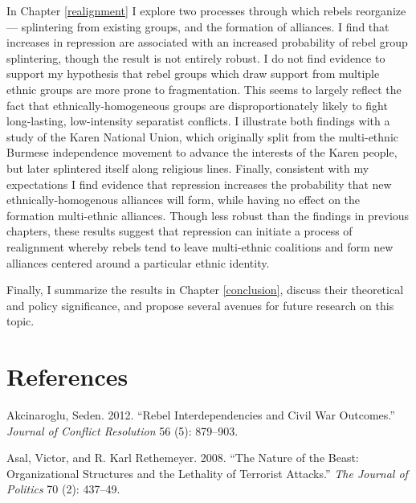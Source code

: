 \documentclass[12pt,]{book}
\theoremstyle{definition}
\theoremstyle{definition}
\theoremstyle{remark}
\begin{document}
In Chapter \ref{realignment} I explore two processes through which
rebels reorganize --- splintering from existing groups, and the
formation of alliances. I find that increases in repression are
associated with an increased probability of rebel group splintering,
though the result is not entirely robust. I do not find evidence to
support my hypothesis that rebel groups which draw support from multiple
ethnic groups are more prone to fragmentation. This seems to largely
reflect the fact that ethnically-homogeneous groups are
disproportionately likely to fight long-lasting, low-intensity
separatist conflicts. I illustrate both findings with a study of the
Karen National Union, which originally split from the multi-ethnic
Burmese independence movement to advance the interests of the Karen
people, but later splintered itself along religious lines. Finally,
consistent with my expectations I find evidence that repression
increases the probability that new ethnically-homogenous alliances will
form, while having no effect on the formation multi-ethnic alliances.
Though less robust than the findings in previous chapters, these results
suggest that repression can initiate a process of realignment whereby
rebels tend to leave multi-ethnic coalitions and form new alliances
centered around a particular ethnic identity.

Finally, I summarize the results in Chapter \ref{conclusion}, discuss
their theoretical and policy significance, and propose several avenues
for future research on this topic.

\chapter*{References}\label{references}


\indent

\setlength{\parindent}{-0.2in} \setlength{\leftskip}{0.2in}
\setlength{\parskip}{8pt}

\singlespacing

\hypertarget{refs}{}
\hypertarget{ref-Akcinaroglu2012a}{}
Akcinaroglu, Seden. 2012. ``Rebel Interdependencies and Civil War
Outcomes.'' \emph{Journal of Conflict Resolution} 56 (5): 879--903.

\hypertarget{ref-Asal2008}{}
Asal, Victor, and R. Karl Rethemeyer. 2008. ``The Nature of the Beast:
Organizational Structures and the Lethality of Terrorist Attacks.''
\emph{The Journal of Politics} 70 (2): 437--49.
\end{document}
